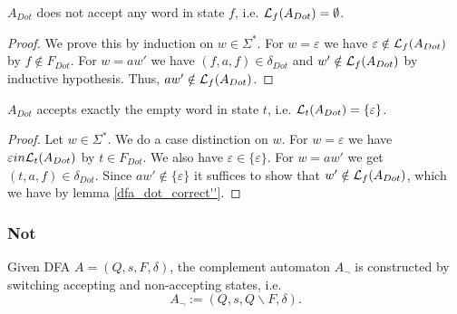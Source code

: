 \begin{lemma}
    \label{dfa_dot_correct''}
    $A_{Dot}$ does not accept any word in state $f$, i.e. $\mathcal{L}_{f}(A_{Dot}) = \emptyset$.
\end{lemma}
\begin{proof}
    We prove this by induction on $w \in \Sigma^*$. 
    For $w = \varepsilon$ we have $\varepsilon \notin \mathcal{L}_{f}(A_{Dot})$ by $f \notin F_{Dot}$.
    For $w = aw'$ we have $(f, a, f) \in \delta_{Dot}$ and $w' \notin \mathcal{L}_{f}(A_{Dot})$ by inductive hypothesis.
    Thus, $aw' \notin \mathcal{L}_{f}(A_{Dot})$.
\end{proof}

\begin{lemma}
    \label{dfa_dot_correct'}
    $A_{Dot}$ accepts exactly the empty word in state $t$, i.e. $\mathcal{L}_{t}(A_{Dot}) = \{\varepsilon\}$.
\end{lemma}
\begin{proof}
    Let $w \in \Sigma^*$. 
    We do a case distinction on $w$.
    For $w = \varepsilon$ we have $\varepsilon in \mathcal{L}_{t}(A_{Dot})$ by $t \in F_{Dot}$. We also have $\varepsilon \in \{\varepsilon\}$.
    For $w = aw'$ we get $(t, a, f) \in \delta_{Dot}$. 
    Since $aw' \notin \{\varepsilon\}$ it suffices to show that 
    $w' \notin \mathcal{L}_{f}(A_{Dot})$,
    which we have by lemma \ref{dfa_dot_correct''}.
\end{proof}


\subsubsection{Not}
\begin{definition}
    Given DFA $A=(Q,s,F,\delta)$, the complement automaton $A_\neg$ is constructed by switching accepting and non-accepting states, i.e.
    \begin{equation*}
       A_\neg := (Q,s,Q\backslash F,\delta). 
    \end{equation*}
\end{definition}

